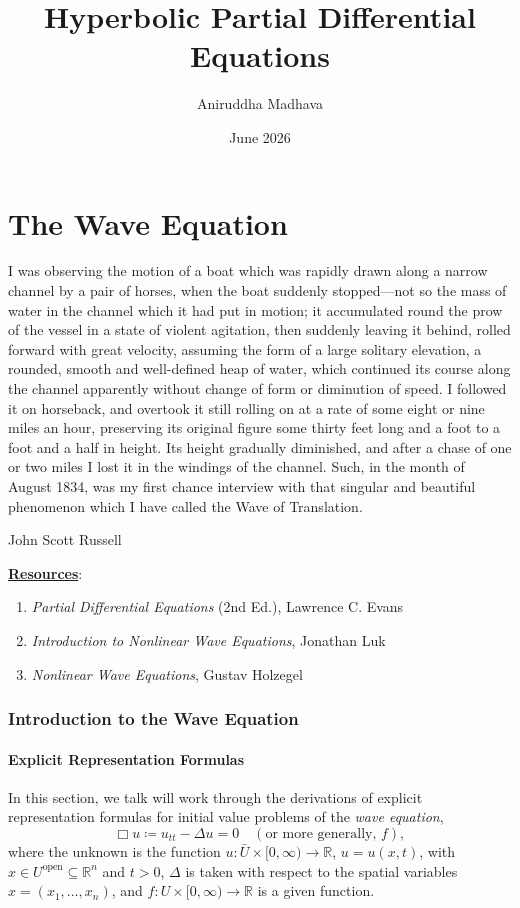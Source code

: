 \documentclass{article}
\title{Hyperbolic Partial Differential Equations}
\author{Aniruddha Madhava}
\date{June 2026}
\numberwithin{equation}{section}
\begin{document}
	
	\maketitle
	\tableofcontents 
	\halfline 
	\newpage 
	
	\part{The Wave Equation}
	\epigraph{I was observing the motion of a boat which was rapidly drawn along a narrow channel by a pair of horses, when the boat suddenly stopped—not so the mass of water in the channel which it had put in motion; it accumulated round the prow of the vessel in a state of violent agitation, then suddenly leaving it behind, rolled forward with great velocity, assuming the form of a large solitary elevation, a rounded, smooth and well-defined heap of water, which continued its course along the channel apparently without change of form or diminution of speed. I followed it on horseback, and overtook it still rolling on at a rate of some eight or nine miles an hour, preserving its original figure some thirty feet long and a foot to a foot and a half in height. Its height gradually diminished, and after a chase of one or two miles I lost it in the windings of the channel. Such, in the month of August 1834, was my first chance interview with that singular and beautiful phenomenon which I have called the Wave of Translation.}{John Scott Russell}
	
	{\huge \uline{\textbf{Resources}}:}
	{\large\begin{enumerate}[label = \arabic{*}.]
			\item \textit{Partial Differential Equations} (2nd Ed.), Lawrence C. Evans
			\item \textit{Introduction to Nonlinear Wave Equations}, Jonathan Luk
			\item \textit{Nonlinear Wave Equations}, Gustav Holzegel
		\end{enumerate}
	}
	
	
	\newpage 
	\section{Introduction to the Wave Equation}
	\subsection{Explicit Representation Formulas}
	
	In this section, we talk will work through the derivations of explicit representation formulas for initial value problems of the \textit{wave equation},
	\begin{equation}
		\Box u\coloneqq u_{tt} - \Delta u = 0 \quad (\text{or more generally, } f), 
	\end{equation}
	where the unknown is the function $u: \bar{U} \times [0, \infty) \to \mathbb{R}$, $u = u(x, t)$, with $x \in U^{\text{open}} \subseteq \mathbb{R}^{n}$ and $t > 0$, $\Delta$ is taken with respect to the spatial variables $x = (x_{1}, \ldots, x_{n})$, and $f: U \times [0, \infty) \to \mathbb{R}$ is a given function. 
	
\end{document}
